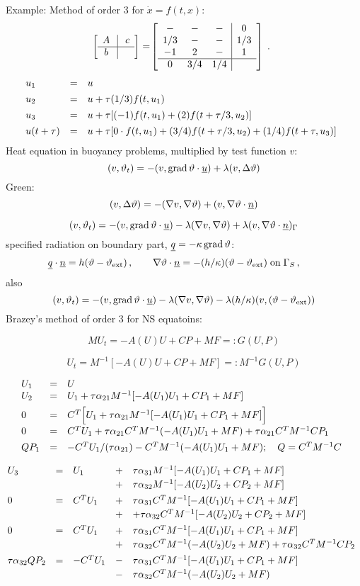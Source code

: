 \documentclass[12pt,a4paper,USenglish,twoside]{book}
\begin{document}
Example: Method of order 3 for $\dot{x} = f(t,x)$:
\renewcommand{\arraystretch}{1.5}
\[
\ba{[}{c|c} A \; &\; c\\ \hline  b \; & \ea{]}
= \ \ba{[}{ccc|c}
  - & - & - &     0\\
  1/3 & - & - &   1/3\\
  -1 & 2 & - &  1\\ \hline
   0 & 3/4 & 1/4
\ea{]}\; .
\]
\renewcommand{\arraystretch}{1}
\[
\ba{.}{lll}
u_1 &=& u \\[1ex]
u_2 &=& u + \tau(1/3)f(t,u_1)\\[1ex]
u_3 &=& u + \tau[(-1)f(t,u_1) + (2)f(t+\tau/3,u_2)]\\[1ex]
u(t+\tau) &=& u + \tau[0\cdot f(t,u_1) + (3/4)f(t+\tau/3,u_2) + (1/4)f(t+\tau,u_3)]
\ea{.}
\]
Heat equation in buoyancy problems, multiplied by test function $v$:
\[
(v,\theta_t) = -  (v,\grad \theta \cdot \u)  + \lambda (v,\Delta \theta) 
\]
Green:
\[
(v,\Delta \theta) = -(\nabla v,\nabla \theta) + (v,\nabla \theta \cdot \n)
\]

\[
(v,\theta_t) = -  (v,\grad \theta \cdot \u) 
 - \lambda (\nabla v,\nabla \theta) + \lambda(v,\nabla \theta \cdot \n)_{\Gamma}
\]
specified radiation on boundary part, $\q = - \kappa \grad \theta$:
\[
 \q \cdot \n = h(\theta - \theta_{\rm ext})\,, \qquad
\nabla \theta\cdot \n = - (h/\kappa)(\theta - \theta_{\rm ext}) 
\; \text{on} \; \Gamma_S\,, \qquad
\]
also
\[
(v,\theta_t) = -  (v,\grad \theta \cdot \u) 
 - \lambda (\nabla v,\nabla \theta) - \lambda(h/\kappa)(v,(\theta - \theta_{\rm ext})) 
\]
\newpage
{\sc Brazey}'s method of order 3 for NS equatoins:

\[
MU_t = -A(U)U + CP + MF =: G(U,P) 
\] 

\[
U_t = M^{-1}[-A(U)U + CP + MF] =: M^{-1}G(U,P) 
\] 

\[
\ba{.}{lll}
U_1 &=& U\\
U_2 &=& U_1 + \tau \alpha_{21} M^{-1}[-A(U_1)U_1 + CP_1 + MF]\\[1ex]
0 &=& C^T\Big[U_1 + \tau \alpha_{21} M^{-1}[-A(U_1)U_1+ CP_1 + MF]\Big] \\[1ex]
0 &=& C^TU_1 + 
\tau \alpha_{21}C^TM^{-1}(-A(U_1)U_1 + MF) +  \tau\alpha_{21}C^TM^{-1}CP_1\\[1ex]
QP_1
&=& - C^TU_1/(\tau\alpha_{21}) - C^TM^{-1}(-A(U_1)U_1 + MF);\quad Q = C^TM^{-1}C
\ea{.}
\]

\[
\ba{.}{lllll}
U_3 &=&  U_1 &+& \tau \alpha_{31} M^{-1}[-A(U_1)U_1 + CP_1 + MF]\\[0.5ex]
&&&+& \tau \alpha_{32} M^{-1}[-A(U_2)U_2 + CP_2 + MF]\\[1ex]
%
0 &=& C^T U_1 &+& \tau \alpha_{31}C^T M^{-1}[-A(U_1)U_1 + CP_1 + MF]\\[0.5ex]
&&     &+&+ \tau \alpha_{32}C^T M^{-1}[-A(U_2)U_2 + CP_2 + MF]\\[1ex]
%
0 &=& C^T U_1 &+& \tau \alpha_{31}C^T M^{-1}[-A(U_1)U_1 + CP_1 + MF]\\[0.5ex]
   &&&+& \tau \alpha_{32}C^T M^{-1}(-A(U_2)U_2  + MF)
   + \tau \alpha_{32}C^T M^{-1}CP_2\\[1ex]
%
\tau \alpha_{32}QP_2 &=&
- C^T U_1 &-& \tau \alpha_{31}C^T M^{-1}[-A(U_1)U_1 + CP_1 + MF]\\[0.5ex]
&&&-& \tau \alpha_{32}C^T M^{-1}(-A(U_2)U_2 + MF) 
\ea{.}
\]
\end{document}
